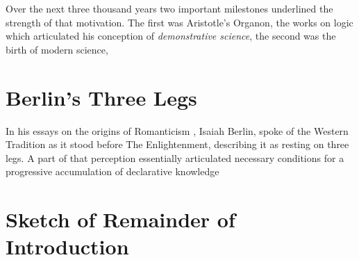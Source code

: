 \documentclass[10pt,titlepage]{book}
\begin{document}
Over the next three thousand years two important milestones underlined the strength of that motivation.
The first was Aristotle's Organon, the works on logic which articulated his conception of \emph{demonstrative science}, the second was the birth of modern science,

\section{Berlin's Three Legs}

In his essays on the origins of Romanticism \cite{berlinRR}, Isaiah Berlin, spoke of the Western Tradition as it stood before The Enlightenment, describing it as resting on three legs.
A part of that perception essentially articulated necessary conditions for a progressive accumulation of declarative knowledge 



\section{Sketch of Remainder of Introduction}
  
\end{document}
